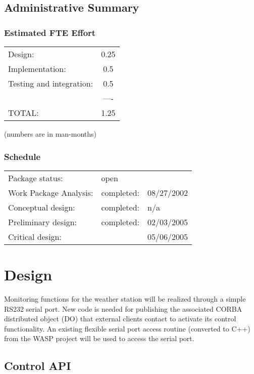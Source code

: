 \documentclass[11pt]{article}
\begin{document}
\subsection{Administrative Summary}
\subsubsection{Estimated FTE Effort}
\begin{tabular}{lc}
Design:& 0.25\\
Implementation:& 0.5\\
Testing and integration:& 0.5\\
& ----\\
TOTAL:& 1.25
\end{tabular}
(numbers are in man-months)
\subsubsection{Schedule}

\begin{tabular}{lll}
Package status:& open&\\
Work Package Analysis: & completed:    &  08/27/2002\\
Conceptual design:& completed: & n/a\\
Preliminary design:& completed:& 02/03/2005\\
Critical design:&     & 05/06/2005\\
\hline
\end{tabular}


\section{Design}

Monitoring functions for the weather station will be realized
through a simple RS232 serial port. New code is needed
for publishing the associated CORBA distributed object (DO) that
external clients contact to activate its control functionality. 
An existing flexible serial port access routine (converted to C++) 
from the WASP project will be used to access the serial port.


\subsection{Control API}
\label{control}
\end{document}
